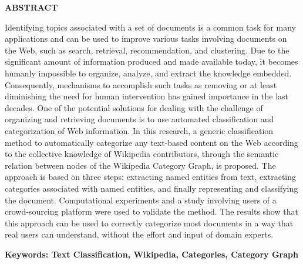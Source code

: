 \begin{center}
    \textbf{ABSTRACT}
    \vspace{40pt}
\end{center}
Identifying topics associated with a set of documents is a common task for many applications and can be used to improve various tasks involving documents on the Web, such as search, retrieval, recommendation, and clustering. Due to the significant amount of information produced and made available today, it becomes humanly impossible to organize, analyze, and extract the knowledge embedded. Consequently, mechanisms to accomplish such tasks as removing or at least diminishing the need for human intervention has gained importance in the last decades. One of the potential solutions for dealing with the challenge of organizing and retrieving documents is to use automated classification and categorization of Web information. In this research, a generic classification method to automatically categorize any text-based content on the Web according to the collective knowledge of Wikipedia contributors, through the semantic relation between nodes of the Wikipedia Category Graph, is proposed. The approach is based on three steps: extracting named entities from text, extracting categories associated with named entities, and finally representing and classifying the document. Computational experiments and a study involving users of a crowd-sourcing platform were used to validate the method. The results show that this approach can be used to correctly categorize most documents in a way that real users can understand, without the effort and input of domain experts.

\vspace{15pt}

\textbf{Keywords: Text Classification, Wikipedia, Categories, Category Graph}
